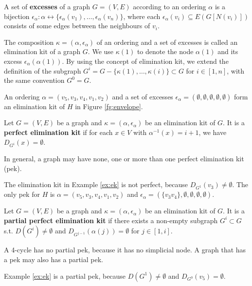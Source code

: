 \begin{definition}
A set of \textbf{excesses} of a graph $G=(V,E)$ according to an ordering $\alpha$ is a bijection $\epsilon_{\alpha}: \alpha \leftrightarrow \{\epsilon_{\alpha}(v_1), \dots, \epsilon_{\alpha}(v_n)\}$, where each $\epsilon_{\alpha}(v_i) \subseteq E(G[N(v_i)])$ consists of some edges between the neighbours of $v_i$.
\end{definition}
The composition $\kappa=(\alpha,\epsilon_{\alpha})$ of an ordering and a set of excesses is called an elimination kit of a graph $G$. We use $\kappa(1)$ to denote the node $\alpha(1)$ and its excess $\epsilon_{\alpha}(\alpha(1))$. By using the concept of elimination kit, we extend the definition of the subgraph $G^i=G-\{\kappa(1),\dots,\kappa(i)\} \subset G$ for $i\in [1,n]$, with the same convention $G^0=G$. 

\begin{example}
\label{ex:ek}
An ordering $\alpha=(v_5,v_3,v_4,v_1,v_2)$ and a set of excesses $\epsilon_{\alpha}=(\emptyset,\emptyset,\emptyset,\emptyset,\emptyset)$ form an elimination kit of $H$ in Figure \ref{fg:envelope}. 
\end{example}

\begin{definition}
Let $G=(V,E)$ be a graph and $\kappa=(\alpha, \epsilon_{\alpha})$ be an elimination kit of $G$. It is a \textbf{perfect elimination kit} if for each $x \in V$ with $\alpha^{-1}(x)=i+1$, we have $D_{G^{i}}(x)=\emptyset$.
\end{definition}
In general, a graph may have none, one or more than one perfect elimination kit (pek). 
\begin{example}
\label{ex:pek}
The elimination kit in Example \ref{ex:ek} is not perfect, because $D_{G^1}(v_3)\neq \emptyset$. The only pek for $H$ is $\alpha=(v_5,v_3,v_4,v_1,v_2)$ and $\epsilon_{\alpha}=(\{v_3v_4\},\emptyset,\emptyset,\emptyset,\emptyset)$. 
\end{example}

\begin{definition}
Let $G=(V,E)$ be a graph and $\kappa=(\alpha, \epsilon_{\alpha})$ be an elimination kit of $G$. It is a \textbf{partial perfect elimination kit} if there exists a non-empty subgraph $G^i \subset G$ s.t. $D(G^i)\neq \emptyset$ and $D_{G^{j-1}}(\alpha(j))=\emptyset$ for $j \in [1,i]$.
\end{definition}
A 4-cycle has no partial pek, because it has no simplicial node. A graph that has a pek may also has a partial pek.
\begin{example}
Example \ref{ex:ek} is a partial pek, because $D(G^1)\neq \emptyset$ and $D_{G^0}(v_5)=\emptyset$. 
\end{example}


